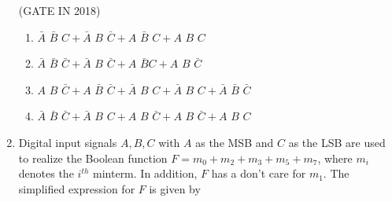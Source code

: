 \begin{enumerate}
\hfill (GATE IN 2018)
  \begin{enumerate}[label=(\Alph*)]                               
	  \item $\bar{A}\hspace{4pt}\bar{B}\hspace{4pt}C+ \bar{A}\hspace{4pt}B\hspace{4pt}\bar{C} + A\hspace{4pt}\bar{B}\hspace{4pt}C + A\hspace{4pt}B\hspace{4pt}C$
	  \item $\bar{A}\hspace{4pt}\bar{B}\hspace{4pt}\bar{C} + \bar{A}\hspace{4pt}B\hspace{4pt}\bar{C} + A\hspace{4pt}\bar{B} C + A\hspace{4pt}B\hspace{4pt}\bar{C}$
	  \item $A\hspace{4pt}B\hspace{4pt} \bar{C} + A\hspace{4pt}\bar{B}\hspace{4pt}\bar{C} + \bar{A}\hspace{4pt}B\hspace{4pt}C + \bar{A}\hspace{4pt}B\hspace{4pt}C + \bar{A}\hspace{4pt}\bar{B}\hspace{4pt}\bar{C}$
	  \item $\bar{A}\hspace{4pt}\bar{B}\hspace{4pt}\bar{C} + \bar{A}\hspace{4pt}B\hspace{4pt}C +A\hspace{4pt}B\hspace{4pt}\bar{C} + A\hspace{4pt}B\hspace{4pt}\bar{C}+ A\hspace{4pt}B\hspace{4pt}C$
\end{enumerate}


		
\item Digital input signals $A, B, C$ with $A$ as the MSB and $C$ as the LSB are used to realize the Boolean function $F=m_0+m_2+m_3+m_5+m_7$, where $m_i$ denotes the $i^{th}$ minterm. In addition, $F$ has a don't care for $m_1$. The simplified expression for $F$ is given by 


\end{enumerate}
